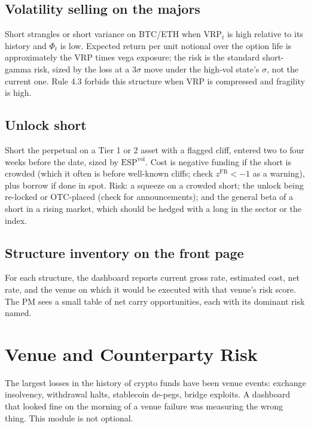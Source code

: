 \documentclass[11pt,a4paper]{article}
\theoremstyle{definition}
\begin{document}
\subsection{Volatility selling on the majors}

Short strangles or short variance on BTC/ETH when $\mathrm{VRP}_t$ is high relative to its history and $\Phi_t$ is low. Expected return per unit notional over the option life is approximately the VRP times vega exposure; the risk is the standard short-gamma risk, sized by the loss at a $3\sigma$ move under the high-vol state's $\sigma$, not the current one. Rule 4.3 forbids this structure when VRP is compressed and fragility is high.

\subsection{Unlock short}

Short the perpetual on a Tier 1 or 2 asset with a flagged cliff, entered two to four weeks before the date, sized by $\mathrm{ESP}^{\mathrm{vol}}$. Cost is negative funding if the short is crowded (which it often is before well-known cliffs; check $z^{\mathrm{FR}} < -1$ as a warning), plus borrow if done in spot. Risk: a squeeze on a crowded short; the unlock being re-locked or OTC-placed (check for announcements); and the general beta of a short in a rising market, which should be hedged with a long in the sector or the index.

\subsection{Structure inventory on the front page}

For each structure, the dashboard reports current gross rate, estimated cost, net rate, and the venue on which it would be executed with that venue's risk score. The PM sees a small table of net carry opportunities, each with its dominant risk named.

\section{Venue and Counterparty Risk}\label{sec:venue}

The largest losses in the history of crypto funds have been venue events: exchange insolvency, withdrawal halts, stablecoin de-pegs, bridge exploits. A dashboard that looked fine on the morning of a venue failure was measuring the wrong thing. This module is not optional.
\end{document}
